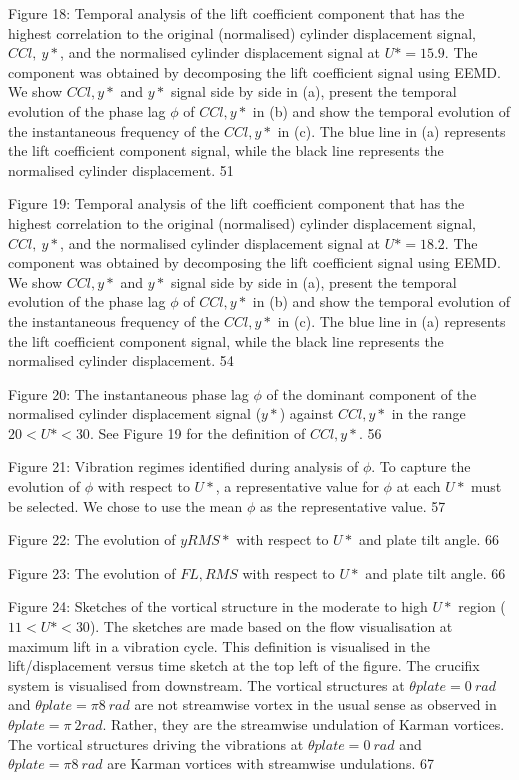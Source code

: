\documentclass[]{article}
\begin{document}
Figure 18: Temporal analysis of the lift coefficient component that has
the highest correlation to the original (normalised) cylinder
displacement signal, \(CCl,\ y*\), and the normalised cylinder
displacement signal at \(U* = 15.9\). The component was obtained by
decomposing the lift coefficient signal using EEMD. We show \(CCl,y*\)
and \(y*\) signal side by side in (a), present the temporal evolution of
the phase lag \(\phi\) of \(CCl,y*\) in (b) and show the temporal
evolution of the instantaneous frequency of the \(CCl,y*\) in (c). The
blue line in (a) represents the lift coefficient component signal, while
the black line represents the normalised cylinder displacement. 51

Figure 19: Temporal analysis of the lift coefficient component that has
the highest correlation to the original (normalised) cylinder
displacement signal, \(CCl,\ y*\), and the normalised cylinder
displacement signal at \(U* = 18.2\). The component was obtained by
decomposing the lift coefficient signal using EEMD. We show \(CCl,y*\)
and \(y*\) signal side by side in (a), present the temporal evolution of
the phase lag \(\phi\) of \(CCl,y*\) in (b) and show the temporal
evolution of the instantaneous frequency of the \(CCl,y*\) in (c). The
blue line in (a) represents the lift coefficient component signal, while
the black line represents the normalised cylinder displacement. 54

Figure 20: The instantaneous phase lag \(\phi\) of the dominant
component of the normalised cylinder displacement signal (\(y*\))
against \(CCl,y*\) in the range \(20 < U* < 30\). See Figure 19 for the
definition of \(CCl,y*\). 56

Figure 21: Vibration regimes identified during analysis of \(\phi\). To
capture the evolution of \(\phi\) with respect to \(U*\), a
representative value for \(\phi\) at each \(U*\) must be selected. We
chose to use the mean \(\phi\) as the representative value. 57

Figure 22: The evolution of \(yRMS*\) with respect to \(U*\) and plate
tilt angle. 66

Figure 23: The evolution of \(FL,RMS\) with respect to \(U*\) and plate
tilt angle. 66

Figure 24: Sketches of the vortical structure in the moderate to high
\(U*\) region (\(11 < U* < 30\)). The sketches are made based on the
flow visualisation at maximum lift in a vibration cycle. This definition
is visualised in the lift/displacement versus time sketch at the top
left of the figure. The crucifix system is visualised from downstream.
The vortical structures at \(\theta plate = 0\ rad\) and
\(\theta plate = \pi 8\ rad\) are not streamwise vortex in the usual
sense as observed in \(\theta plate = \pi\ 2rad\). Rather, they are the
streamwise undulation of Karman vortices. The vortical structures
driving the vibrations at \(\theta plate = 0\ rad\) and
\(\theta plate = \pi 8\ rad\) are Karman vortices with streamwise
undulations. 67
\end{document}
